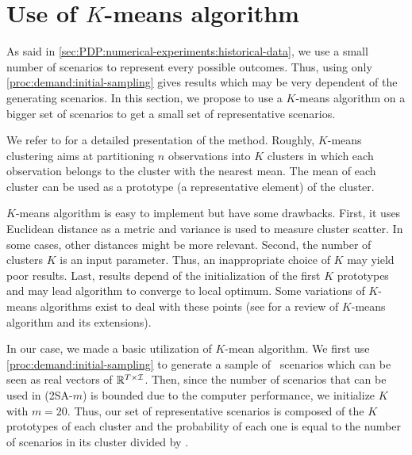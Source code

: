 


\section{Use of $K$-means algorithm}
\label{sec:PDP:numerical-experiments:k-means}




As said in \cref{sec:PDP:numerical-experiments:historical-data}, we use a small number of scenarios to represent every possible outcomes.
Thus, using only \cref{proc:demand:initial-sampling} gives results which may be very dependent of the generating scenarios.
In this section, we propose to use a $K$-means algorithm on a bigger set of scenarios to get a small set of representative scenarios.




We refer to \cite{} for a detailed presentation of the method.
Roughly, $K$-means clustering aims at partitioning $n$ observations into $K$ clusters in which each observation belongs to the cluster with the nearest mean.
The mean of each cluster can be used as a prototype (\ie a representative element) of the cluster.


$K$-means algorithm is easy to implement but have some drawbacks.
First, it uses Euclidean distance as a metric and variance is used to measure cluster scatter.
In some cases, other distances might be more relevant.
Second, the number of clusters $K$ is an input parameter.
Thus, an inappropriate choice of $K$ may yield poor results.
Last, results depend of the initialization of the first $K$ prototypes and may lead algorithm to converge to local optimum.
Some variations of $K$-means algorithms exist to deal with these points (see \cite{Jain2010} for a review of $K$-means algorithm and its extensions).


\medskip

In our case, we made a basic utilization of $K$-mean algorithm.
We first use \cref{proc:demand:initial-sampling} to generate a sample of \tbc\ scenarios which can be seen as real vectors of $\mathbb{R}^{T\times\mathcal{I}}$.
Then, since the number of scenarios that can be used in (2SA-$m$) is bounded due to the computer performance, we initialize $K$ with $m=20$.
Thus, our set of representative scenarios is composed of the $K$ prototypes of each cluster and the probability of each one is equal to the number of scenarios in its cluster divided by \tbc.



